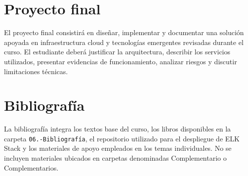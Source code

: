 \documentclass[
  coursetitle={Cómputo Nube y Tecnologías Emergentes},
  coursehours={96},
  coursedate={Verano 2026},
  doctype={Guía del curso},
  otherlangs={english,french},
  authorname={Lázaro},
  authorsurname={Bustio-Martínez},
  authortitle={PhD},
  role={Profesor Investigador},
  email={lbustio@inaoe.mx},
  phone={5559504000},
  ext={7459},
  institution={Instituto Nacional de Astrofísica, Óptica y Electrónica (INAOE)},
  department={Maestría en Ciencias en Tecnologías de Seguridad},
  address={Luis Enrique Erro 1, Sta. Ma. Tonantzintla, San Andrés Cholula, CP 72840, Puebla, México},
  margin={0.5in}
]{../../lbustio_lecture_notes}
\begin{document}
\section{Proyecto final}
El proyecto final consistirá en diseñar, implementar y documentar una solución apoyada en infraestructura cloud y tecnologías emergentes revisadas durante el curso. El estudiante deberá justificar la arquitectura, describir los servicios utilizados, presentar evidencias de funcionamiento, analizar riesgos y discutir limitaciones técnicas.

\section{Bibliografía}

La bibliografía integra los textos base del curso, los libros disponibles en la carpeta \texttt{06.-Bibliografía}, el repositorio utilizado para el despliegue de ELK Stack y los materiales de apoyo empleados en los temas individuales. No se incluyen materiales ubicados en carpetas denominadas Complementario o Complementarios.
\end{document}
